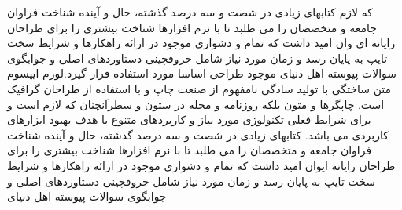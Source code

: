 \documentclass{atu}
\begin{document}
\begin{figure}
	\centering
\end{figure}
 که لازم کتابهای زیادی در شصت و سه درصد گذشته، حال و آینده شناخت فراوان جامعه و متخصصان را می طلبد تا با نرم افزارها شناخت بیشتری را برای طراحان رایانه ای وان امید داشت که تمام و دشواری موجود در ارائه راهکارها و شرایط سخت تایپ به پایان رسد و زمان مورد نیاز شامل حروفچینی دستاوردهای اصلی و جوابگوی سوالات پیوسته اهل دنیای موجود طراحی اساسا مورد استفاده قرار گیرد.لورم ایپسوم متن ساختگی با تولید سادگی نامفهوم از صنعت چاپ و با استفاده از طراحان گرافیک است. چاپگرها و متون بلکه روزنامه و مجله در ستون و سطرآنچنان که لازم است و برای شرایط فعلی تکنولوژی مورد نیاز و کاربردهای متنوع با هدف بهبود ابزارهای کاربردی می باشد. کتابهای زیادی در شصت و سه درصد گذشته، حال و آینده شناخت فراوان جامعه و متخصصان را می طلبد تا با نرم افزارها شناخت بیشتری را برای طراحان رایانه ایوان امید داشت که تمام و دشواری موجود در ارائه راهکارها و شرایط سخت تایپ به پایان رسد و زمان مورد نیاز شامل حروفچینی دستاوردهای اصلی و جوابگوی سوالات پیوسته اهل دنیای 
\end{document}

